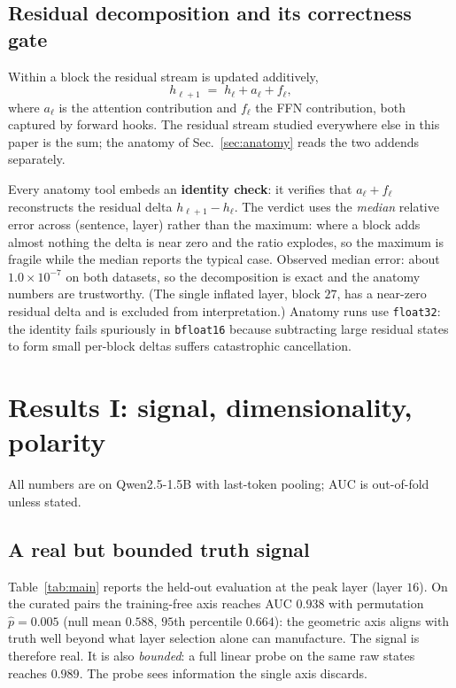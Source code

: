 \documentclass[11pt]{article}
\begin{document}
\subsection{Residual decomposition and its correctness gate}
\label{sec:decomp}

Within a block the residual stream is updated additively,
\begin{equation}
h_{\ell+1} \;=\; h_{\ell} + a_{\ell} + f_{\ell},
\end{equation}
where $a_{\ell}$ is the attention contribution and $f_{\ell}$ the FFN
contribution, both captured by forward hooks. The residual stream studied
everywhere else in this paper is the sum; the anatomy of
Sec.~\ref{sec:anatomy} reads the two addends separately.

Every anatomy tool embeds an \textbf{identity check}: it verifies that
$a_{\ell} + f_{\ell}$ reconstructs the residual delta $h_{\ell+1} - h_{\ell}$.
The verdict uses the \emph{median} relative error across (sentence, layer)
rather than the maximum: where a block adds almost nothing the delta is near
zero and the ratio explodes, so the maximum is fragile while the median
reports the typical case. Observed median error: about $1.0 \times 10^{-7}$
on both datasets, so the decomposition is exact and the anatomy numbers are
trustworthy. (The single inflated layer, block $27$, has a near-zero residual
delta and is excluded from interpretation.) Anatomy runs use
\texttt{float32}: the identity fails spuriously in \texttt{bfloat16} because
subtracting large residual states to form small per-block deltas suffers
catastrophic cancellation.

\section{Results I: signal, dimensionality, polarity}
\label{sec:results}

All numbers are on Qwen2.5-1.5B with last-token pooling; AUC is out-of-fold
unless stated.

\subsection{A real but bounded truth signal}
\label{sec:signal}

Table~\ref{tab:main} reports the held-out evaluation at the peak layer (layer
$16$). On the curated pairs the training-free axis reaches AUC $0.938$ with
permutation $\hat{p} = 0.005$ (null mean $0.588$, $95$th percentile $0.664$):
the geometric axis aligns with truth well beyond what layer selection alone
can manufacture. The signal is therefore real. It is also \emph{bounded}: a
full linear probe on the same raw states reaches $0.989$. The probe sees
information the single axis discards.
\end{document}
